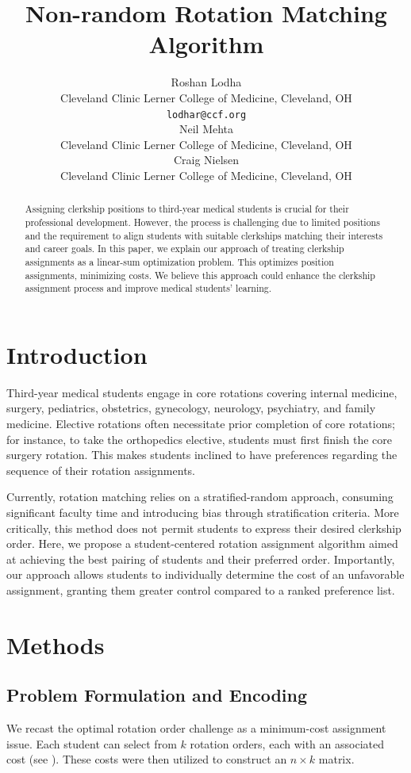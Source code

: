 \documentclass{article}
\title{Non-random Rotation Matching Algorithm}
\author{
	Roshan Lodha \\
	Cleveland Clinic Lerner College of Medicine, Cleveland, OH \\
	\texttt{lodhar@ccf.org} \\
	\And
	Neil Mehta \\
	Cleveland Clinic Lerner College of Medicine, Cleveland, OH \\
	\And
	Craig Nielsen \\
	Cleveland Clinic Lerner College of Medicine, Cleveland, OH \\
}
\begin{document}
\maketitle

\begin{abstract}
	Assigning clerkship positions to third-year medical students is crucial for their professional development. However, the process is challenging due to limited positions and the requirement to align students with suitable clerkships matching their interests and career goals. In this paper, we explain our approach of treating clerkship assignments as a linear-sum optimization problem. This optimizes position assignments, minimizing costs. We believe this approach could enhance the clerkship assignment process and improve medical students' learning.
\end{abstract}


\section{Introduction}
Third-year medical students engage in core rotations covering internal medicine, surgery, pediatrics, obstetrics, gynecology, neurology, psychiatry, and family medicine. Elective rotations often necessitate prior completion of core rotations; for instance, to take the orthopedics elective, students must first finish the core surgery rotation. This makes students inclined to have preferences regarding the sequence of their rotation assignments.

Currently, rotation matching relies on a stratified-random approach, consuming significant faculty time and introducing bias through stratification criteria. More critically, this method does not permit students to express their desired clerkship order. Here, we propose a student-centered rotation assignment algorithm aimed at achieving the best pairing of students and their preferred order. Importantly, our approach allows students to individually determine the cost of an unfavorable assignment, granting them greater control compared to a ranked preference list.

\section{Methods}
\subsection{Problem Formulation and Encoding}
We recast the optimal rotation order challenge as a minimum-cost assignment issue. Each student can select from $k$ rotation orders, each with an associated cost (see ). These costs were then utilized to construct an $n \times k$ matrix.
\end{document}
